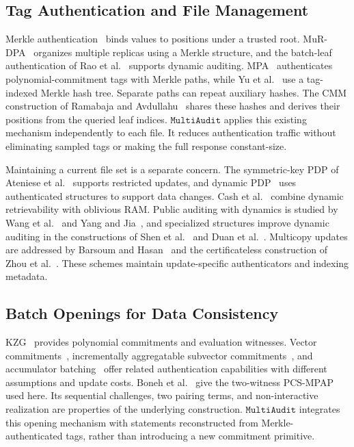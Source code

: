 \documentclass[lettersize,journal]{IEEEtran}
\newcommand{\MultiAudit}{\ensuremath{\mathtt{MultiAudit}}}
\begin{document}
\subsection{Tag Authentication and File Management}
Merkle authentication~\cite{Merkle1988} binds values to positions under a trusted root. MuR-DPA~\cite{Liu2015MuRDPA} organizes multiple replicas using a Merkle structure, and the batch-leaf authentication of Rao et al.~\cite{Rao2020BatchMHT} supports dynamic auditing. MPA~\cite{XuTIFS26} authenticates polynomial-commitment tags with Merkle paths, while Yu et al.~\cite{YuTC25} use a tag-indexed Merkle hash tree. Separate paths can repeat auxiliary hashes. The CMM construction of Ramabaja and Avdullahu~\cite{Ramabaja2020Compact} shares these hashes and derives their positions from the queried leaf indices. \MultiAudit{} applies this existing mechanism independently to each file. It reduces authentication traffic without eliminating sampled tags or making the full response constant-size.

Maintaining a current file set is a separate concern. The symmetric-key PDP of Ateniese et al.~\cite{Ateniese2008Scalable} supports restricted updates, and dynamic PDP~\cite{Erway2009DPDP} uses authenticated structures to support data changes. Cash et al.~\cite{Cash2013DPOR} combine dynamic retrievability with oblivious RAM. Public auditing with dynamics is studied by Wang et al.~\cite{Wang2011TPDS} and Yang and Jia~\cite{Yang2013TPDS}, and specialized structures improve dynamic auditing in the constructions of Shen et al.~\cite{Shen2017Dynamic} and Duan et al.~\cite{Duan2023DecentralizedAudit}. Multicopy updates are addressed by Barsoum and Hasan~\cite{Barsoum2015Multicopy} and the certificateless construction of Zhou et al.~\cite{Zhou2022Certificateless}. These schemes maintain update-specific authenticators and indexing metadata. 

\subsection{Batch Openings for Data Consistency}
KZG~\cite{Kate2010KZG} provides polynomial commitments and evaluation witnesses. Vector commitments~\cite{Catalano2013VC}, incrementally aggregatable subvector commitments~\cite{Campanelli20ASIACRYPT}, and accumulator batching~\cite{Boneh2019Batching} offer related authentication capabilities with different assumptions and update costs. Boneh et al.~\cite[Sec.~4.1]{Boneh2020PCS} give the two-witness PCS-MPAP used here. Its sequential challenges, two pairing terms, and non-interactive realization are properties of the underlying construction. \MultiAudit{} integrates this opening mechanism with statements reconstructed from Merkle-authenticated tags, rather than introducing a new commitment primitive.
\end{document}

